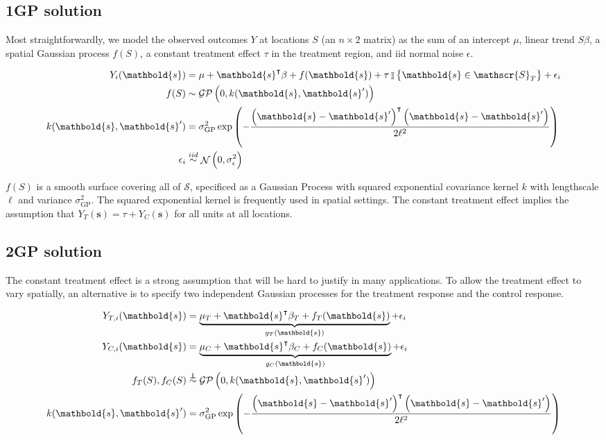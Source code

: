 \documentclass[letter]{article}
\DeclareMathOperator{\Ind}{\mathbb{I}}
\DeclareMathOperator{\normal}{\mathcal{N}}
\newcommand{\gp}{\mathcal{GP}}
\newcommand{\trans}{^{\intercal}}
\newcommand{\scrS}{\mathscr{S}}
\newcommand{\sigmaf}{\sigma_{\mathrm{GP}}}
\newcommand{\svec}{\mathbold{s}}
\newcommand{\indep}{\protect\mathpalette{\protect\independenT}{\perp}}
\def\independenT#1#2{\mathrel{\rlap{$#1#2$}\mkern2mu{#1#2}}}
\newcommand{\iid}{iid}
\newcommand{\eqlabel}[1]{\label{#1}}
\begin{document}
\subsection{1GP solution}\label{gp-solution}

Most straightforwardly, we model the observed outcomes \(Y\) at locations \(S\) (an \(n \times 2\) matrix) as the sum of an intercept \(\mu\), linear trend \(S\beta\), a spatial Gaussian process \(f(S)\), a constant treatment effect \(\tau\) in the treatment region, and iid normal noise \(\epsilon\).

\begin{equation}\begin{split}
Y_i(\svec) &= \mu+\svec\trans\beta + f(\svec) + \tau \Ind\cbr{\svec \in \scrS_T} + \epsilon_i \\
f(S) &\sim \gp\del{0, k(\svec, \svec')} \\
k(\svec,\svec') &= \sigmaf^2 \exp\del{ - \frac{\del{\svec-\svec'}\trans\del{\svec-\svec'}}{2 \ell^2}} \\
\epsilon_i &\overset{\iid}{\sim} \normal\del{0,\sigma_\epsilon^2}
\end{split}\end{equation}

\(f(S)\) is a smooth surface covering all of \(\scrS\), specificed as a Gaussian Process with squared exponential covariance kernel \(k\) with lengthscale \(\ell\) and variance \(\sigmaf^2\). The squared exponential kernel is frequently used in spatial settings. The constant treatment effect implies the assumption that \(Y_T(\svec) = \tau + Y_C(\svec)\) for all units at all locations.
    


    	\subsection{2GP solution}\label{gp-solution}
    

\label{sec:twogp}
    	The constant treatment effect is a strong assumption that will be hard to justify in many applications. To allow the treatment effect to vary spatially, an alternative is to specify two independent Gaussian processes for the treatment response and the control response.

\begin{equation}
\begin{split}
Y_{T,i}(\svec) &= \underbrace{\mu_T + \svec\trans\beta_T + f_T(\svec)}_{g_T(\svec)} + \epsilon_i \\
Y_{C,i}(\svec) &= \underbrace{\mu_C + \svec\trans\beta_C + f_C(\svec)}_{g_C(\svec)} + \epsilon_i \\
f_T(S), f_C(S) &\overset{\indep}{\sim} \gp\del{0, k(\svec, \svec')} \\
k(\svec,\svec') &= \sigmaf^2 \exp\del{ - \frac{\del{\svec-\svec'}\trans\del{\svec-\svec'}}{2 \ell^2}}
\end{split}
\eqlabel{eq:spec2gp}
\end{equation}
\end{document}

